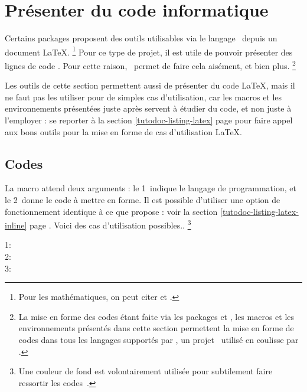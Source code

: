 \documentclass{../main/main}
\begin{document}
\section{Présenter du code informatique}

Certains packages proposent des outils utilisables via le langage \lua\ depuis un document \LaTeX.%
\footnote{
	Pour les mathématiques, on peut citer  et .
}
Pour ce type de projet, il est utile de pouvoir présenter des lignes de code \lua.
Pour cette raison, \thisproj\ permet de faire cela aisément, et bien plus.%
\footnote{
    La mise en forme des codes étant faite via les packages  et , les macros et les environnements présentés dans cette section permettent la mise en forme de codes dans tous les langages supportés par \pygmentsREF, un projet \python\ utilisé en coulisse par .
}


\begin{tdoccaut}
	Les outils de cette section permettent aussi de présenter du code \LaTeX, mais il ne faut pas les utiliser pour de simples cas d'utilisation, car les macros et les environnements présentées juste après servent à étudier du code, et non juste à l'employer : se reporter à la section \ref{tutodoc-listing-latex} page \pageref{tutodoc-listing-latex} pour faire appel aux bons outils pour la mise en forme de cas d'utilisation \LaTeX.
\end{tdoccaut}



\subsection{Codes }

La macro  attend deux arguments : le 1\ier\ indique le langage de programmation, et le 2\ieme\ donne le code à mettre en forme.
Il est possible d'utiliser une option de fonctionnement identique à ce que propose  : voir la section \ref{tutodoc-listing-latex-inline} page \pageref{tutodoc-listing-latex-inline}.
Voici des cas d'utilisation possibles..%
    \footnote{
    	Une couleur de fond est volontairement utilisée pour subtilement faire ressortir les codes \,.
    }

\begin{tdoclatex}
1:              \\
2:  \\
3: 
\end{tdoclatex}
\end{document}
